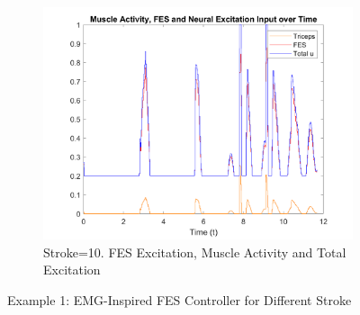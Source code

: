 \begin{landscape}
\begin{figure}[ht]
        \begin{subfigure}[b]{0.33\textwidth}
            \centering
            \includegraphics[width=\linewidth]{Pictures/Results/Controller/Stroke10/20_fes.png}
            \caption{Stroke=10. FES Excitation, Muscle Activity and Total Excitation}
        \end{subfigure}
            
        \caption{Example 1: EMG-Inspired FES Controller for Different Stroke}
        \label{fig:Ex1FESControllerDifferentStrokes}
    \end{figure}
\end{landscape}

